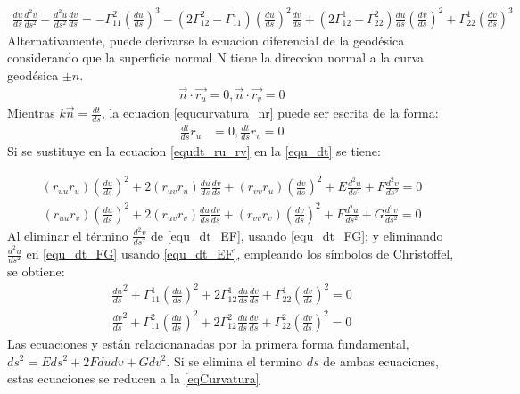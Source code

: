 \documentclass{endm}
\begin{document}
\small{
\begin{align} 
\frac{du}{ds} \frac{d^2v}{ds^2} - \frac{d^2u}{ds^2} \frac{dv}{ds} = -  \Gamma_{11}^2 (\frac{du}{ds})^3 - (2 \Gamma_{12}^2 -  \Gamma_{11}^1 ) (\frac{du}{ds})^2 \frac{dv}{ds} + (2 \Gamma_{12}^1 - \Gamma_{22}^2) \frac{du}{ds} (\frac{dv}{ds})^2 + \Gamma_{22}^1 (\frac{dv}{ds})^3
\label{eqCurvatura}
\end{align}
}
Alternativamente, puede derivarse la ecuacion diferencial de la geod\'esica considerando que la superficie normal N tiene la direccion normal a la curva geod\'esica $\pm n$.
\small{
\begin{align} 
\vec {n} \cdot \vec {r_u} = 0, \vec {n} \cdot \vec {r_v} = 0
\label{equcurvatura_nr}
\end{align}
}
Mientras $k \vec {n} = \frac{dt}{ds} $, la ecuacion 
\ref{equcurvatura_nr} 
puede ser escrita de la forma:
\small{
\begin{align} 
\frac{dt}{ds} r_u &=0,\frac{dt}{ds} r_v =0
\label{equdt_ru_rv}
\end{align}
}
Si se sustituye en la ecuacion \ref{equdt_ru_rv} en la \ref{equ_dt} se tiene:

\small{
\begin{align} 
(r_{uu} r_u) (\frac{du}{ds})^2 + 2 (r_{uv} r_u) \frac{du}{ds} \frac{dv}{ds} + (r_{vv} r_u) (\frac{dv}{ds})^2 + E \frac{d^2u}{ds^2} + F \frac{d^2v}{ds^2} = 0
\label{equ_dt_EF}
\end{align}
}
\small{
\begin{align} 
(r_{uu} r_v) (\frac{du}{ds})^2 + 2 (r_{uv} r_v) \frac{du}{ds} \frac{dv}{ds} + (r_{vv} r_v) (\frac{dv}{ds})^2 + F \frac{d^2u}{ds^2} + G \frac{d^2v}{ds^2} = 0
\label{equ_dt_FG}
\end{align}
}
Al eliminar el t\'ermino $\frac{d^2v}{ds^2}$ de \ref{equ_dt_EF}, usando \ref{equ_dt_FG}; y eliminando $\frac{d^2u}{ds^2}$ en \ref{equ_dt_FG} usando \ref{equ_dt_EF}, empleando los s\'imbolos de Christoffel, se obtiene:
\small{
\begin{align}
\frac{du}{ds}^2 + \Gamma_{11}^1 (\frac{du}{ds})^2 + 2 \Gamma_{12}^1 \frac{du}{ds} \frac{dv}{ds} + \Gamma_{22}^1 (\frac{dv}{ds})^2 = 0
\label{equ1_Geodesica}
\end{align}
}
\small{
\begin{align}
\frac{dv}{ds}^2 + \Gamma_{11}^2 (\frac{du}{ds})^2 + 2 \Gamma_{12}^2 \frac{du}{ds} \frac{dv}{ds} + \Gamma_{22}^2 (\frac{dv}{ds})^2 = 0
\label{equ2_Geodesica}
\end{align}
}
Las ecuaciones \label{equ1_Geodesica} y \label{equ2_Geodesica} est\'an relacionanadas por la primera forma fundamental, $ds^2 = E ds^2+ 2 Fdudv+ G dv^2$. Si se elimina el termino $ds$ de ambas ecuaciones, estas ecuaciones se reducen a la \ref{eqCurvatura}
\end{document}
